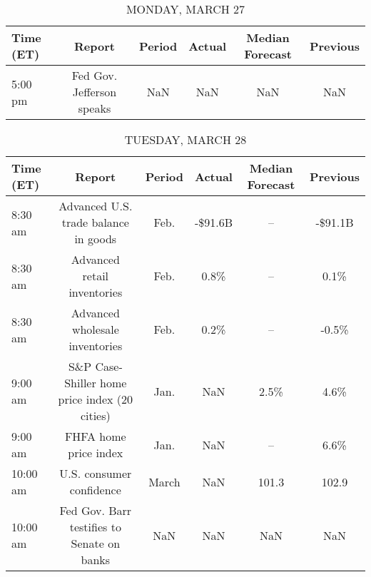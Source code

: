 \documentclass{article}%
\begin{document}
%
\normalsize%


\begin{table}[htbp]%
\caption{MONDAY, MARCH 27}%
\centering%
\begin{adjustbox}{width=1\textwidth}%
\begin{tabular}{lccccc}
\toprule
Time (ET) &                    Report & Period & Actual & Median Forecast & Previous \\
\midrule
  5:00 pm & Fed Gov. Jefferson speaks &    NaN &    NaN &             NaN &      NaN \\
\bottomrule
\end{tabular}
%
\end{adjustbox}%
\end{table}

%


\begin{table}[htbp]%
\caption{TUESDAY, MARCH 28}%
\centering%
\begin{adjustbox}{width=1\textwidth}%
\begin{tabular}{lccccc}
\toprule
Time (ET) &                                        Report & Period &  Actual & Median Forecast & Previous \\
\midrule
  8:30 am &          Advanced U.S. trade balance in goods &   Feb. & -\$91.6B &              -- &  -\$91.1B \\
  8:30 am &                   Advanced retail inventories &   Feb. &    0.8\% &              -- &     0.1\% \\
  8:30 am &                Advanced wholesale inventories &   Feb. &    0.2\% &              -- &    -0.5\% \\
  9:00 am & S\&P Case-Shiller home price index (20 cities) &   Jan. &     NaN &            2.5\% &     4.6\% \\
  9:00 am &                         FHFA home price index &   Jan. &     NaN &              -- &     6.6\% \\
 10:00 am &                      U.S. consumer confidence &  March &     NaN &           101.3 &    102.9 \\
 10:00 am &    Fed Gov. Barr testifies to Senate on banks &    NaN &     NaN &             NaN &      NaN \\
\bottomrule
\end{tabular}
%
\end{adjustbox}%
\end{table}

%
\end{document}
